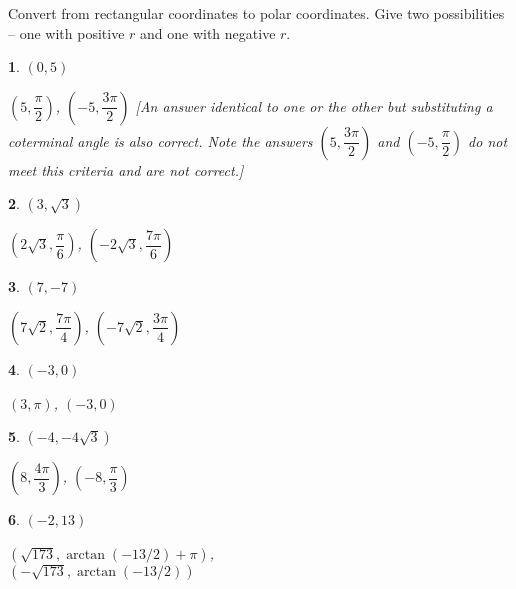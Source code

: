 \documentclass{amsbook}
\newtheorem{exc}{}
\newenvironment{ex}{\begin{exc}\normalfont}{\end{exc}}
\numberwithin{section}{chapter}
\numberwithin{equation}{chapter}
\begin{document}
Convert from rectangular coordinates to polar coordinates. Give two possibilities -- one with positive $r$ and one with negative $r$.

\begin{multicols}{3}

\begin{ex}
	$\left( 0 , 5 \right)$
	\begin{sol}
	$\left( 5 , \dfrac{\pi}{2} \right)$, $\left( -5 , \dfrac{3\pi}{2} \right)$  [An answer identical to one or the other but substituting a coterminal angle is also correct. Note the answers $\left( 5 , \dfrac{3\pi}{2} \right)$ and $\left( -5 , \dfrac{\pi}{2} \right)$ do not meet this criteria and are not correct.]
	\end{sol}
\end{ex}

\begin{ex}
	$\left( 3 , \sqrt{3} \right)$
	\begin{sol}
		$\left( 2\sqrt{3} , \dfrac{\pi}{6} \right)$, $\left( -2\sqrt{3} , \dfrac{7\pi}{6} \right)$
	\end{sol}
\end{ex}

\begin{ex}
	$\left( 7 , -7 \right)$
	\begin{sol}
		$\left( 7\sqrt{2} ,  \dfrac{7\pi}{4}\right)$, 		$\left( -7\sqrt{2} ,  \dfrac{3\pi}{4}\right)$
	\end{sol}
\end{ex}

\begin{ex}
	$\left( -3 , 0 \right)$
	\begin{sol}
		$\left( 3 , \pi \right)$, 		$\left( -3 , 0 \right)$
	\end{sol}
\end{ex}

\begin{ex}
	$\left( -4 , -4\sqrt{3} \right)$
	\begin{sol}
		$\left( 8 , \dfrac{4\pi}{3} \right)$, $\left( -8 , \dfrac{\pi}{3} \right)$
	\end{sol}
\end{ex}

\begin{ex}
	$\left( -2 , 13 \right)$
	\begin{sol}
		$\left( \sqrt{173} , \arctan(-13/2)+\pi \right)$, \\
			$\left( -\sqrt{173} , \arctan(-13/2)\right)$
	\end{sol}
\end{ex}
\end{multicols}
\end{document}
